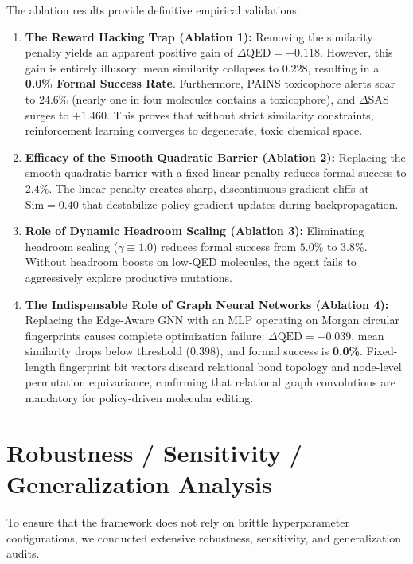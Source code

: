 \documentclass{ieeeaccess}
\begin{document}
The ablation results provide definitive empirical validations:
\begin{enumerate}
    \item \textbf{The Reward Hacking Trap (Ablation 1):} Removing the similarity penalty yields an apparent positive gain of $\Delta\text{QED} = +0.118$. However, this gain is entirely illusory: mean similarity collapses to $\mathbf{0.228}$, resulting in a \textbf{0.0\% Formal Success Rate}. Furthermore, PAINS toxicophore alerts soar to $\mathbf{24.6\%}$ (nearly one in four molecules contains a toxicophore), and $\Delta\text{SAS}$ surges to $+1.460$. This proves that without strict similarity constraints, reinforcement learning converges to degenerate, toxic chemical space.
    \item \textbf{Efficacy of the Smooth Quadratic Barrier (Ablation 2):} Replacing the smooth quadratic barrier with a fixed linear penalty reduces formal success to $2.4\%$. The linear penalty creates sharp, discontinuous gradient cliffs at $\text{Sim} = 0.40$ that destabilize policy gradient updates during backpropagation.
    \item \textbf{Role of Dynamic Headroom Scaling (Ablation 3):} Eliminating headroom scaling ($\gamma \equiv 1.0$) reduces formal success from $5.0\%$ to $3.8\%$. Without headroom boosts on low-QED molecules, the agent fails to aggressively explore productive mutations.
    \item \textbf{The Indispensable Role of Graph Neural Networks (Ablation 4):} Replacing the Edge-Aware GNN with an MLP operating on Morgan circular fingerprints causes complete optimization failure: $\Delta\text{QED} = -0.039$, mean similarity drops below threshold ($0.398$), and formal success is \textbf{0.0\%}. Fixed-length fingerprint bit vectors discard relational bond topology and node-level permutation equivariance, confirming that relational graph convolutions are mandatory for policy-driven molecular editing.
\end{enumerate}


\section{Robustness / Sensitivity / Generalization Analysis}
\label{sec:robustness}
To ensure that the framework does not rely on brittle hyperparameter configurations, we conducted extensive robustness, sensitivity, and generalization audits.
\end{document}
